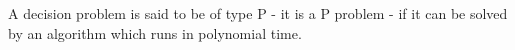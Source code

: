 A decision problem is said to be of type P - it is a P problem - if it can
be solved by an algorithm which runs in polynomial time.
